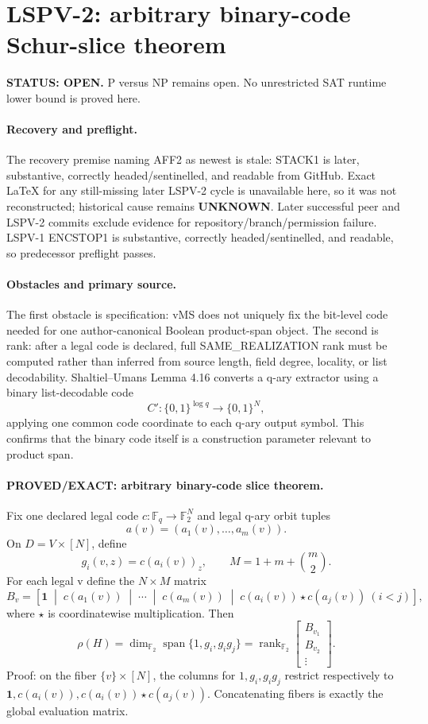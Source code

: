 \documentclass[11pt]{article}
\begin{document}
\section*{LSPV-2: arbitrary binary-code Schur-slice theorem}
\textbf{STATUS: OPEN.} P versus NP remains open. No unrestricted SAT runtime lower bound is proved here.

\paragraph{Recovery and preflight.}
The recovery premise naming AFF2 as newest is stale: STACK1 is later, substantive, correctly headed/sentinelled, and readable from GitHub. Exact LaTeX for any still-missing later LSPV-2 cycle is unavailable here, so it was not reconstructed; historical cause remains \textbf{UNKNOWN}. Later successful peer and LSPV-2 commits exclude evidence for repository/branch/permission failure. LSPV-1 ENCSTOP1 is substantive, correctly headed/sentinelled, and readable, so predecessor preflight passes.

\paragraph{Obstacles and primary source.}
The first obstacle is specification: vMS does not uniquely fix the bit-level code needed for one author-canonical Boolean product-span object. The second is rank: after a legal code is declared, full SAME\_REALIZATION rank must be computed rather than inferred from source length, field degree, locality, or list decodability. Shaltiel--Umans Lemma 4.16 converts a q-ary extractor using a binary list-decodable code
\[
C':\{0,1\}^{\log q}\to\{0,1\}^{N},
\]
applying one common code coordinate to each q-ary output symbol. This confirms that the binary code itself is a construction parameter relevant to product span.

\paragraph{PROVED/EXACT: arbitrary binary-code slice theorem.}
Fix one declared legal code \(c:\mathbb F_q\to\mathbb F_2^N\) and legal q-ary orbit tuples
\[
a(v)=(a_1(v),\ldots,a_m(v)).
\]
On \(D=V\times[N]\), define
\[
g_i(v,z)=c(a_i(v))_z,
\qquad
M=1+m+\binom m2.
\]
For each legal v define the \(N\times M\) matrix
\[
B_v=
\left[
\mathbf 1\;\middle|\;
c(a_1(v))\;\middle|\;\cdots\;\middle|\;c(a_m(v))
\;\middle|\;
c(a_i(v))\star c(a_j(v))\ (i<j)
\right],
\]
where \(\star\) is coordinatewise multiplication. Then
\[
\boxed{
\rho(H)=
\dim_{\mathbb F_2}\operatorname{span}\{1,g_i,g_i g_j\}
=
\operatorname{rank}_{\mathbb F_2}
\begin{bmatrix}
B_{v_1}\\
B_{v_2}\\
\vdots
\end{bmatrix}.
}
\]
Proof: on the fiber \(\{v\}\times[N]\), the columns for \(1,g_i,g_i g_j\) restrict respectively to \(\mathbf1,c(a_i(v)),c(a_i(v))\star c(a_j(v))\). Concatenating fibers is exactly the global evaluation matrix.
\end{document}
